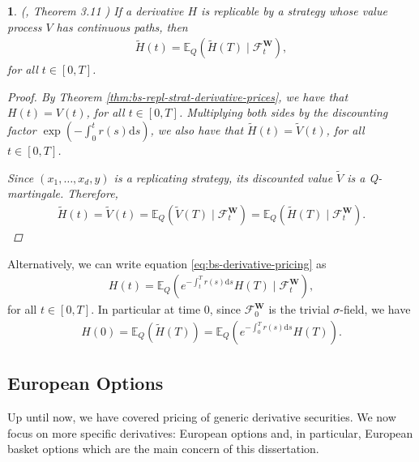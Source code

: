 \documentclass[english]{article}
\numberwithin{equation}{section}
\numberwithin{figure}{section}
\theoremstyle{bolddescit}
\newtheorem{theorem}{\protect\theoremname}[section]
\theoremstyle{definition}
\theoremstyle{definition}
\theoremstyle{plain}
\theoremstyle{plain}
\theoremstyle{bolddesc}
\theoremstyle{plain}
\theoremstyle{remark}
\providecommand{\theoremname}{Theorem}
\begin{document}
\begin{theorem}\label{thm:bs-derivative-pricing}
  (\cite{capinski_blackscholes_2012}, Theorem 3.11 )
  If a derivative $H$ is replicable by a strategy whose value process $V$ has continuous paths, then
  \begin{align}\label{eq:bs-derivative-pricing}
    \widetilde{H}(t) = \mathbb{E}_Q(\widetilde{H}(T) \mid \mathcal{F}^\mathbf{W}_t),
  \end{align}
  for all $t \in [0,T]$.

  \begin{proof}
    By Theorem \ref{thm:bs-repl-strat-derivative-prices}, we have that $H(t) = V(t)$, for all $t \in [0,T]$. Multiplying both sides by the discounting factor $\exp\left(-\int_0^t r(s) \mathrm{d}s\right)$, we also have that $\widetilde{H}(t) = \widetilde{V}(t)$, for all $t \in [0,T]$.

    Since $(x_1, \ldots, x_d, y)$ is a replicating strategy, its discounted value $\widetilde{V}$ is a Q-martingale. Therefore,
    \begin{align*}
      \widetilde{H}(t) = \widetilde{V}(t)
      = \mathbb{E}_Q(\widetilde{V}(T) \mid \mathcal{F}^\mathbf{W}_t)
      = \mathbb{E}_Q(\widetilde{H}(T) \mid \mathcal{F}^\mathbf{W}_t).
    \end{align*}
  \end{proof}
\end{theorem}

Alternatively, we can write equation \eqref{eq:bs-derivative-pricing} as
\begin{align*}
  H(t) = \mathbb{E}_Q\left(e^{-\int_t^T r(s) \mathrm{d}s} H(T) \mid \mathcal{F}^\mathbf{W}_t\right),
\end{align*}
for all $t \in [0,T]$. In particular at time 0, since $\mathcal{F}^\mathbf{W}_0$ is the trivial $\sigma$-field, we have
\begin{align*}
  H(0) = \mathbb{E}_Q\left(\widetilde{H}(T)\right)
  = \mathbb{E}_Q\left(e^{-\int_0^T r(s) \mathrm{d}s} H(T)\right).
\end{align*}

\subsection{European Options}

Up until now, we have covered pricing of generic derivative securities. We now focus on more specific derivatives: European options and, in particular, European basket options which are the main concern of this dissertation.
\end{document}
